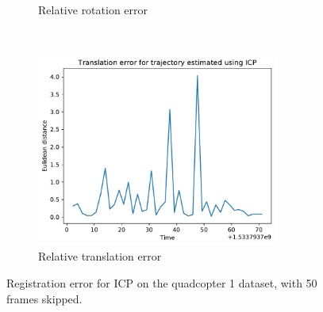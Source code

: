 \documentclass[12pt,a4paper]{article}
\begin{document}
\begin{figure}[b!]
\begin{subfigure}[t]{0.5\textwidth}
        \caption{Relative rotation error}
      \end{subfigure} %
      ~
      \begin{subfigure}[t]{0.5\textwidth}
        \includegraphics[width=80mm]{../quad/basic-reg-saves/50/ret_icp.pdf}
        \caption{Relative translation error}
      \end{subfigure}
      \caption{Registration error for ICP on the quadcopter 1 dataset, with 50 frames skipped.}
      \label{f: quad3 error}
    \end{figure}
\end{document}
